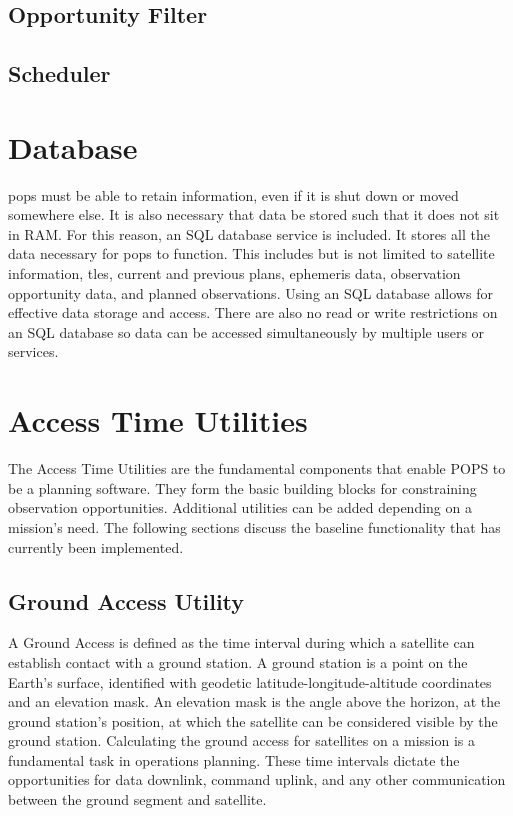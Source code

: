 \subsection{Opportunity Filter}

\subsection{Scheduler}




\section{Database}

\gls{pops} must be able to retain information, even if it is
shut down or moved somewhere else. It is also necessary that data be stored
such that it does not sit in RAM. For this reason, an SQL database service is
included. It stores all the data necessary for \gls{pops} to function. This
includes but is not limited to satellite information, \gls{tle}s, current and
previous plans, ephemeris data, observation opportunity data, and planned
observations. Using an SQL database allows for effective data storage and
access. There are also no read or write restrictions on an SQL database so data
can be accessed simultaneously by multiple users or services.





\section{Access Time Utilities}


The Access Time Utilities are the fundamental components that enable POPS to be
a planning software. They form the basic building blocks for constraining
observation opportunities. Additional utilities can be added depending on a
mission’s need. The following sections discuss the baseline functionality that
has currently been implemented.


\subsection{Ground Access Utility}

A Ground Access is defined as the time interval during which a satellite can
establish contact with a ground station. A ground station is a point on the
Earth’s surface, identified with geodetic latitude-longitude-altitude
coordinates and an elevation mask. An elevation mask is the angle above the
horizon, at the ground station’s position, at which the satellite can be
considered visible by the ground station. Calculating the ground access for
satellites on a mission is a fundamental task in operations planning. These
time intervals dictate the opportunities for data downlink, command uplink, and
any other communication between the ground segment and satellite. 

